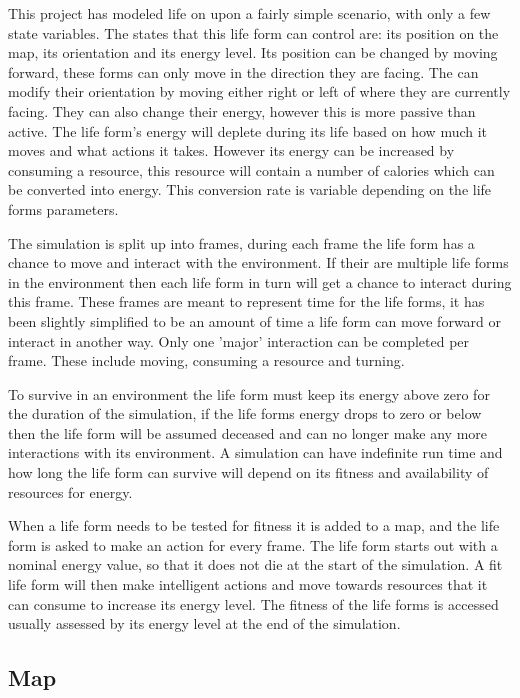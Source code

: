 \documentclass[12pt]{article}
\begin{document}
This project has modeled life on upon a fairly simple scenario, with only a few state variables. The states that this life form
can control are: its position on the map, its orientation and its energy level. Its position can be changed by moving forward, these 
forms can only move in the direction they are facing. The can modify their orientation by moving either right or left of where they 
are currently facing. They can also change their energy, however this is more passive than active. The life form's energy will
deplete during its life based on how much it moves and what actions it takes. However its energy can be increased by consuming a 
resource, this resource will contain a number of calories which can be converted into energy. This conversion rate is variable
depending on the life forms parameters. 

The simulation is split up into frames, during each frame the life form has a chance to move and interact with the environment. If their
are multiple life forms in the environment then each life form in turn will get a chance to interact during this frame. These frames are
meant to represent time for the life forms, it has been slightly simplified to be an amount of time a life form can move forward or interact in another way. Only one 'major' interaction can be completed per frame. These include moving, consuming a resource and turning.

To survive in an environment the life form must keep its energy above zero for the duration of the simulation, if the life forms energy
drops to zero or below then the life form will be assumed deceased and can no longer make any more interactions with its environment. A simulation can have indefinite run time and how long the life form can survive will depend on its fitness and availability of resources for energy.

When a life form needs to be tested for fitness it is added to a map, and the life form is asked to make an action for every frame. The life form starts out
with a nominal energy value, so that it does not die at the start of the simulation. A fit life form will then make intelligent actions and move towards resources
that it can consume to increase its energy level. The fitness of the life forms is accessed usually assessed by its energy level at the end of the simulation. 


\subsection{Map}
\end{document}
